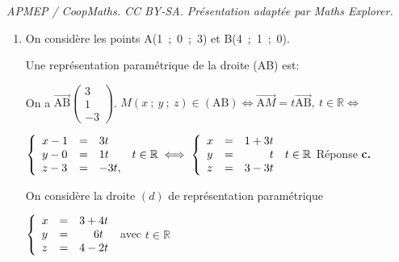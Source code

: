 \documentclass[10pt]{article}
\providecommand{\R}{\mathbb{R}}
\providecommand{\vect}[1]{\overrightarrow{#1}}
\begin{document}
\noindent\textit{APMEP / CoopMaths. CC BY-SA. Présentation adaptée par Maths Explorer.}\par\medskip
\medskip















\begin{enumerate}
\item On considère les points A(1~;~0~;~3) et B(4~;~1~;~0).

Une représentation paramétrique de la droite (AB) est:























On a $\vect{\text{AB}}\begin{pmatrix}3\\1\\-3\end{pmatrix}$.
$M(x~;~y~;~z) \in (\text{AB}) \iff \vect{\text{A}M} = t\vect{\text{AB}}, \: t \in \R \iff $

$\left\{\begin{array}{l c l}x - 1&=&3t\\y - 0&=&1t\\z - 3&=&- 3t, \end{array}\right. \: t \in \R\iff \left\{\begin{array}{l c l}
x &=& 1 + 3t\\
y &=&\phantom{1 + 3}t\\
z&=&3 - 3t
\end{array}\right.\: t \in \R$ Réponse \textbf{c.~}

On considère la droite $(d)$ de représentation paramétrique 

$\left\{\begin{array}{l c l}
x&=&3 + 4t\\
y&=&\phantom{3 + }6t\\
z&=&4 - 2 t
\end{array}\right.$ avec $t \in \R$


\end{enumerate}
\end{document}
